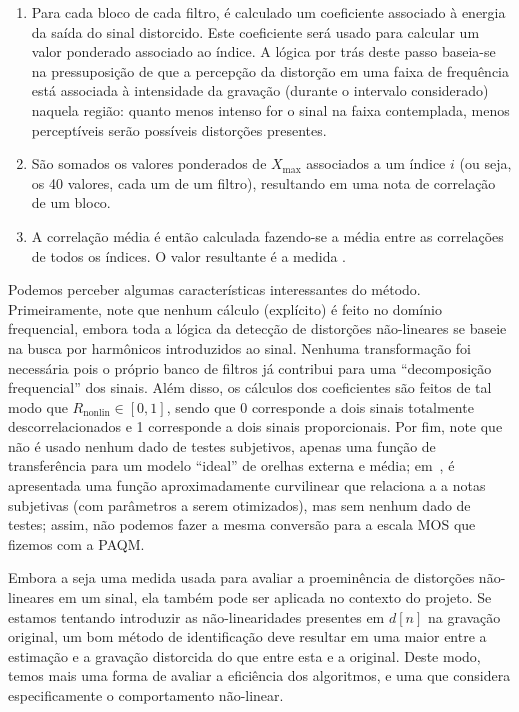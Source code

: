\begin{enumerate}
    \item Para cada bloco de cada filtro, é calculado um coeficiente associado à energia da saída do sinal distorcido. Este coeficiente será usado para calcular um valor ponderado associado ao índice. A lógica por trás deste passo baseia-se na pressuposição de que a percepção da distorção em uma faixa de frequência está associada à intensidade da gravação (durante o intervalo considerado) naquela região: quanto menos intenso for o sinal na faixa contemplada, menos perceptíveis serão possíveis distorções presentes.
    
    \item São somados os valores ponderados de $X_{\max}$ associados a um índice $i$ (ou seja, os 40 valores, cada um de um filtro), resultando em uma nota de correlação de um bloco.
    
    \item A correlação média é então calculada fazendo-se a média entre as correlações de todos os índices. O valor resultante é a medida \rnonlin{}.
\end{enumerate}

Podemos perceber algumas características interessantes do método. Primeiramente, note que nenhum cálculo (explícito) é feito no domínio frequencial, embora toda a lógica da detecção de distorções não-lineares se baseie na busca por harmônicos introduzidos ao sinal. Nenhuma transformação foi necessária pois o próprio banco de filtros já contribui para uma ``decomposição frequencial'' dos sinais. Além disso, os cálculos dos coeficientes são feitos de tal modo que $R_{\text{nonlin}} \in [0, 1]$, sendo que 0 corresponde a dois sinais totalmente descorrelacionados e 1 corresponde a dois sinais proporcionais. Por fim, note que não é usado nenhum dado de testes subjetivos, apenas uma função de transferência para um modelo ``ideal'' de orelhas externa e média; em~\cite{tan-2004}, é apresentada uma função aproximadamente curvilinear que relaciona a \rnonlin{} a notas subjetivas (com parâmetros a serem otimizados), mas sem nenhum dado de testes; assim, não podemos fazer a mesma conversão para a escala MOS que fizemos com a PAQM.

Embora a \rnonlin{} seja uma medida usada para avaliar a proeminência de distorções não-lineares em um sinal, ela também pode ser aplicada no contexto do projeto. Se estamos tentando introduzir as não-linearidades presentes em $d[n]$ na gravação original, um bom método de identificação deve resultar em uma \rnonlin{} maior entre a estimação e a gravação distorcida do que entre esta e a original. Deste modo, temos mais uma forma de avaliar a eficiência dos algoritmos, e uma que considera especificamente o comportamento não-linear.

